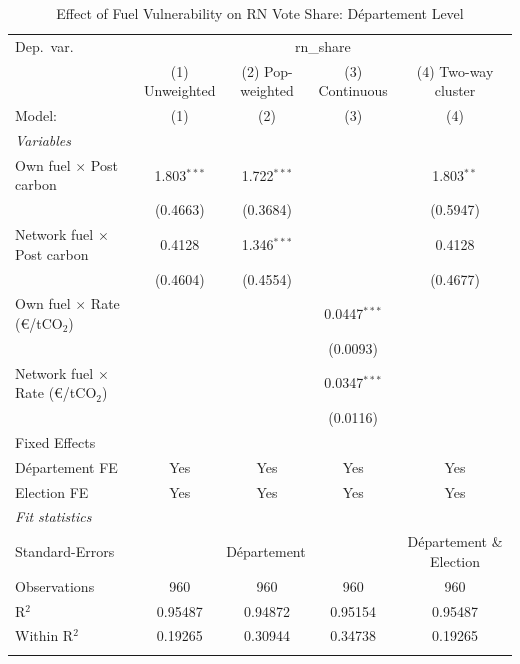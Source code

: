 \begin{table}[htbp]
   \caption{Effect of Fuel Vulnerability on RN Vote Share: D\'{e}partement Level}
   \centering
   \begin{tabular}{lcccc}
      \tabularnewline \midrule \midrule
      Dep.\ var. & \multicolumn{4}{c}{rn\_share}\\
                                                   & (1) Unweighted & (2) Pop-weighted & (3) Continuous & (4) Two-way cluster \\   
      Model:                                       & (1)            & (2)              & (3)            & (4)\\  
      \midrule
      \emph{Variables}\\
      Own fuel $\times$ Post carbon                & 1.803$^{***}$  & 1.722$^{***}$    &                & 1.803$^{**}$\\   
                                                   & (0.4663)       & (0.3684)         &                & (0.5947)\\   
      Network fuel $\times$ Post carbon            & 0.4128         & 1.346$^{***}$    &                & 0.4128\\   
                                                   & (0.4604)       & (0.4554)         &                & (0.4677)\\   
      Own fuel $\times$ Rate (\euro/tCO$_2$)       &                &                  & 0.0447$^{***}$ &   \\   
                                                   &                &                  & (0.0093)       &   \\   
      Network fuel $\times$ Rate (\euro/tCO$_2$)   &                &                  & 0.0347$^{***}$ &   \\   
                                                   &                &                  & (0.0116)       &   \\   
      \midrule Fixed Effects\\
      D\'{e}partement FE                           & Yes            & Yes              & Yes            & Yes\\  
      Election FE                                  & Yes            & Yes              & Yes            & Yes\\  
      \midrule
      \emph{Fit statistics}\\
      Standard-Errors & \multicolumn{3}{c}{D\'{e}partement} & D\'{e}partement \& Election \\ 
      Observations                                 & 960            & 960              & 960            & 960\\  
      R$^2$                                        & 0.95487        & 0.94872          & 0.95154        & 0.95487\\  
      Within R$^2$                                 & 0.19265        & 0.30944          & 0.34738        & 0.19265\\  
      \midrule \midrule & \tabularnewline
   \end{tabular}
\end{table}
